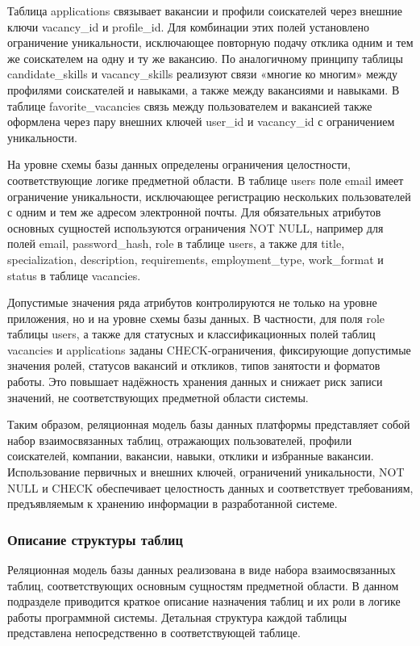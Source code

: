Таблица applications связывает вакансии и профили соискателей через внешние ключи vacancy\_id и profile\_id. Для комбинации этих полей установлено ограничение уникальности, исключающее повторную подачу отклика одним и тем же соискателем на одну и ту же вакансию. По аналогичному принципу таблицы candidate\_skills и vacancy\_skills реализуют связи «многие ко многим» между профилями соискателей и навыками, а также между вакансиями и навыками. В таблице favorite\_vacancies связь между пользователем и вакансией также оформлена через пару внешних ключей user\_id и vacancy\_id с ограничением уникальности.

На уровне схемы базы данных определены ограничения целостности, соответствующие логике предметной области. В таблице users поле email имеет ограничение уникальности, исключающее регистрацию нескольких пользователей с одним и тем же адресом электронной почты. Для обязательных атрибутов основных сущностей используются ограничения NOT NULL, например для полей email, password\_hash, role в таблице users, а также для title, specialization, description, requirements, employment\_type, work\_format и status в таблице vacancies.

Допустимые значения ряда атрибутов контролируются не только на уровне приложения, но и на уровне схемы базы данных. В частности, для поля role таблицы users, а также для статусных и классификационных полей таблиц vacancies и applications заданы CHECK-ограничения, фиксирующие допустимые значения ролей, статусов вакансий и откликов, типов занятости и форматов работы. Это повышает надёжность хранения данных и снижает риск записи значений, не соответствующих предметной области системы.

Таким образом, реляционная модель базы данных платформы представляет собой набор взаимосвязанных таблиц, отражающих пользователей, профили соискателей, компании, вакансии, навыки, отклики и избранные вакансии. Использование первичных и внешних ключей, ограничений уникальности, NOT NULL и CHECK обеспечивает целостность данных и соответствует требованиям, предъявляемым к хранению информации в разработанной системе.

\subsubsection{Описание структуры таблиц}

Реляционная модель базы данных реализована в виде набора взаимосвязанных таблиц, соответствующих основным сущностям предметной области. В данном подразделе приводится краткое описание назначения таблиц и их роли в логике работы программной системы. Детальная структура каждой таблицы представлена непосредственно в соответствующей таблице.

